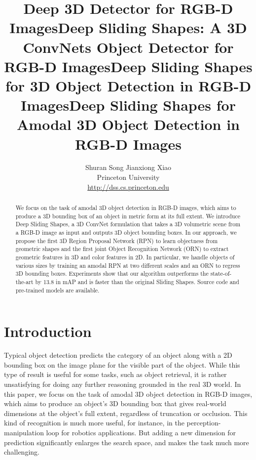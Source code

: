 \documentclass[10pt,twocolumn,letterpaper]{article}
\begin{document}
\title{Deep 3D Detector for RGB-D Images}
\title{Deep Sliding Shapes: A 3D ConvNets Object Detector for RGB-D Images}
\title{Deep Sliding Shapes for 3D Object Detection in RGB-D Images}
\title{Deep Sliding Shapes for Amodal 3D Object Detection in RGB-D Images}

\author{Shuran Song \quad Jianxiong Xiao\\
Princeton University\\
\href{http://dss.cs.princeton.edu}{http://dss.cs.princeton.edu}}

\maketitle




\begin{abstract}


We focus on the task of amodal 3D object detection in RGB-D images,
which aims to produce a 3D bounding box of an object in metric form at its full extent.
We introduce Deep Sliding Shapes, 
a 3D ConvNet formulation that takes a 3D volumetric scene from a RGB-D image as input and outputs 3D object bounding boxes. 
In our approach, we propose the first 3D Region Proposal Network (RPN)
to learn objectness from geometric shapes and the first joint Object Recognition Network (ORN) to extract geometric features in 3D and color features in 2D.
In particular, we handle objects of various sizes by training an amodal RPN at two different scales and an ORN to regress 3D bounding boxes.
Experiments show that our algorithm outperforms the state-of-the-art by 13.8 in mAP
and is  faster than the original Sliding Shapes. 
Source code and pre-trained models are available.




\end{abstract}

\vspace{-5mm}
\section{Introduction}

Typical object detection predicts the category of an object along with a 2D bounding box on the image plane for the visible part of the object.
While this type of result is useful for some tasks, such as object retrieval, 
it is rather unsatisfying for doing any further reasoning grounded in the real 3D world.
In this paper, we 
focus on the task of amodal 3D object detection in RGB-D images,
which aims to produce  an object's 3D bounding box that gives real-world dimensions at the object's full extent, regardless of truncation or occlusion.
This kind of recognition is much more useful, for instance, in the perception-manipulation loop for robotics applications.
But adding a new dimension for prediction significantly enlarges the search space, and makes the task much more challenging.
\end{document}
